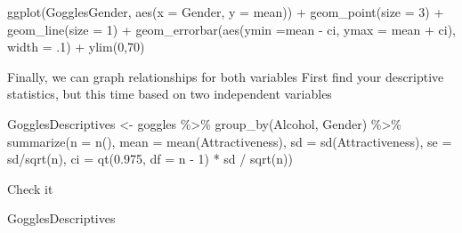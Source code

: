 \documentclass[
]{book}
\newenvironment{Shaded}{\begin{snugshade}}{\end{snugshade}}
\newcommand{\AttributeTok}[1]{\textcolor[rgb]{0.77,0.63,0.00}{#1}}
\newcommand{\DecValTok}[1]{\textcolor[rgb]{0.00,0.00,0.81}{#1}}
\newcommand{\FloatTok}[1]{\textcolor[rgb]{0.00,0.00,0.81}{#1}}
\newcommand{\FunctionTok}[1]{\textcolor[rgb]{0.00,0.00,0.00}{#1}}
\newcommand{\NormalTok}[1]{#1}
\newcommand{\OtherTok}[1]{\textcolor[rgb]{0.56,0.35,0.01}{#1}}
\newcommand{\SpecialCharTok}[1]{\textcolor[rgb]{0.00,0.00,0.00}{#1}}
\begin{document}
\begin{Shaded}
\begin{Highlighting}[]
\FunctionTok{ggplot}\NormalTok{(GogglesGender, }\FunctionTok{aes}\NormalTok{(}\AttributeTok{x =}\NormalTok{ Gender,}
                           \AttributeTok{y =}\NormalTok{ mean)) }\SpecialCharTok{+}
  \FunctionTok{geom\_point}\NormalTok{(}\AttributeTok{size =} \DecValTok{3}\NormalTok{) }\SpecialCharTok{+}
  \FunctionTok{geom\_line}\NormalTok{(}\AttributeTok{size =} \DecValTok{1}\NormalTok{) }\SpecialCharTok{+}
  \FunctionTok{geom\_errorbar}\NormalTok{(}\FunctionTok{aes}\NormalTok{(}\AttributeTok{ymin  =}\NormalTok{mean }\SpecialCharTok{{-}}\NormalTok{ ci, }
                    \AttributeTok{ymax =}\NormalTok{ mean }\SpecialCharTok{+}\NormalTok{ ci), }
                \AttributeTok{width =}\NormalTok{ .}\DecValTok{1}\NormalTok{) }\SpecialCharTok{+}
  \FunctionTok{ylim}\NormalTok{(}\DecValTok{0}\NormalTok{,}\DecValTok{70}\NormalTok{)}
\end{Highlighting}
\end{Shaded}

Finally, we can graph relationships for both variables
First find your descriptive statistics, but this time based on two independent variables

\begin{Shaded}
\begin{Highlighting}[]
\NormalTok{GogglesDescriptives }\OtherTok{\textless{}{-}}\NormalTok{ goggles }\SpecialCharTok{\%\textgreater{}\%}
  \FunctionTok{group\_by}\NormalTok{(Alcohol, Gender) }\SpecialCharTok{\%\textgreater{}\%}
  \FunctionTok{summarize}\NormalTok{(}\AttributeTok{n =} \FunctionTok{n}\NormalTok{(),}
            \AttributeTok{mean =} \FunctionTok{mean}\NormalTok{(Attractiveness),}
            \AttributeTok{sd =} \FunctionTok{sd}\NormalTok{(Attractiveness),}
            \AttributeTok{se =}\NormalTok{ sd}\SpecialCharTok{/}\FunctionTok{sqrt}\NormalTok{(n),}
            \AttributeTok{ci =} \FunctionTok{qt}\NormalTok{(}\FloatTok{0.975}\NormalTok{, }\AttributeTok{df =}\NormalTok{ n }\SpecialCharTok{{-}} \DecValTok{1}\NormalTok{) }\SpecialCharTok{*}\NormalTok{ sd }\SpecialCharTok{/} \FunctionTok{sqrt}\NormalTok{(n))}
\end{Highlighting}
\end{Shaded}

Check it

\begin{Shaded}
\begin{Highlighting}[]
\NormalTok{GogglesDescriptives}
\end{Highlighting}
\end{Shaded}
\end{document}

